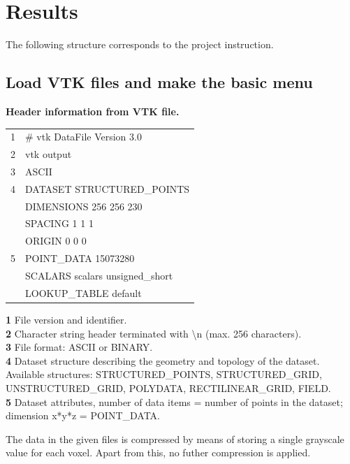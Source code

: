 \chapter{Results}
The following structure corresponds to the project instruction.


\section{Load VTK files and make the basic menu} 

\textbf{Header information from VTK file.}

\begin{table}[h]
	\ttfamily
	\small
	\begin{tabular}{l|l}
		1 & \# vtk DataFile Version 3.0     \\
		2 & vtk output                      \\
		3 & ASCII                           \\
		4 & DATASET STRUCTURED\_POINTS      \\
		& DIMENSIONS 256 256 230          \\
		& SPACING 1 1 1                   \\
		& ORIGIN 0 0 0                    \\
		5 & POINT\_DATA 15073280            \\
		& SCALARS scalars unsigned\_short \\
		& LOOKUP\_TABLE default          
	\end{tabular}
\end{table}

\noindent
\textbf{1} File version and identifier.\\
\textbf{2} Character string header terminated with \textbackslash n (max. 256 characters).\\
\textbf{3} File format: ASCII or BINARY.\\
\textbf{4} Dataset structure describing the geometry and topology of the dataset. Available structures: STRUCTURED\_POINTS, STRUCTURED\_GRID, UNSTRUCTURED\_GRID, POLYDATA, RECTILINEAR\_GRID, FIELD.\\
\textbf{5} Dataset attributes, number of data items = number of points in the dataset; dimension x*y*z = POINT\_DATA.

The data in the given files is compressed by means of storing a single grayscale value for each voxel. Apart from this, no futher compression is applied.

